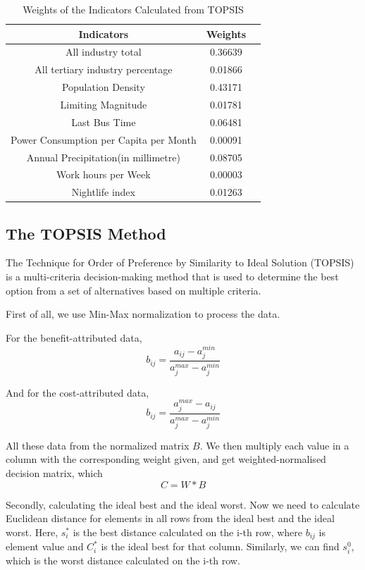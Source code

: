 \begin{table}[H] \centering
    \caption{Weights of the Indicators Calculated from TOPSIS}
    \begin{tabular}{ccl}
        \toprule
        Indicators & Weights\\ \hline
        All industry total & 0.36639\\
        All tertiary industry percentage & 0.01866\\
        Population Density & 0.43171\\
        Limiting Magnitude & 0.01781\\
        Last Bus Time & 0.06481\\
        Power Consumption per Capita per Month & 0.00091\\
        Annual Precipitation(in millimetre) & 0.08705\\
        Work hours per Week & 0.00003\\
        Nightlife index & 0.01263\\
        \bottomrule
    \end{tabular}
\end{table}


\subsection{The TOPSIS Method}

The Technique for Order of Preference by Similarity to Ideal Solution (TOPSIS) is a multi-criteria decision-making method that is used to determine the best option from a set of alternatives based on multiple criteria. 

First of all, we use Min-Max normalization to process the data.

For the benefit-attributed data,
$$b_{ij}=\frac{a_{ij}-a_j^{min}}{a_j^{max}-a_j^{min}}$$

And for the cost-attributed data,
$$b_{ij}=\frac{a_{j}^{max}-a_{ij}}{a_j^{max}-a_j^{min}}$$

All these data from the normalized matrix $B$. We then multiply each value in a column with the corresponding weight given, and get weighted-normalised decision matrix, which $$C=W*B$$

Secondly, calculating the ideal best and the ideal worst. Now we need to calculate Euclidean distance for elements in all rows from the ideal best and the ideal worst. Here, $s_i^*$ is the best distance calculated on the i-th row, where $b_{ij}$ is element value and $C_i^{*}$ is the ideal best for that column. Similarly, we can find $s_i^0$, which is the worst distance calculated on the i-th row.

